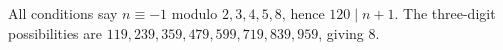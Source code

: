 All conditions say $n\equiv-1$ modulo $2,3,4,5,8$, hence $120\mid n+1$. The three-digit possibilities are $119,239,359,479,599,719,839,959$, giving $\boxed8$.

